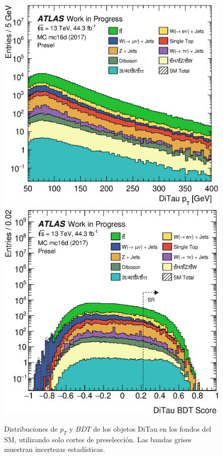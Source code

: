 \begin{figure}[t]
    \centering
    \includegraphics[width=0.49\fulllinewidth]{Assets/Plots/Presel/h_stack_mc16d_ditau_pt.eps}
    \includegraphics[width=0.49\fulllinewidth]{Assets/Plots/Presel/h_stack_mc16d_ditau_bdt.eps}

    \caption{Distribuciones de $p_T$ y $BDT$ de los objetos DiTau en los fondos del SM, utilizando solo cortes de preselección. Las bandas grises muestran incertezas estadísticas.}
    \label{fig:ch4:presel:h_ditaus}
\end{figure}

